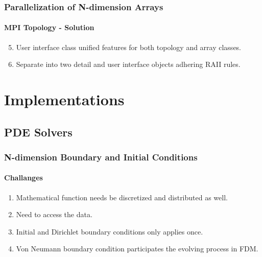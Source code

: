 \begin{frame}
  \frametitle{Parallelization of N-dimension Arrays}
  \framesubtitle{MPI Topology - Solution}
  \begin{enumerate}
    \setcounter{enumi}{4}
    \item User interface class unified features for both topology and array classes.
    \item Separate into two detail and user interface objects adhering RAII rules.
  \end{enumerate}
\end{frame}


































































\section{Implementations}
\subsection{PDE Solvers}
\begin{frame}
  \frametitle{N-dimension Boundary and Initial Conditions}
  \framesubtitle{Challanges}
  \begin{enumerate}
    \item Mathematical function needs be discretized and distributed as well.
    \item Need to access the data.
    \item Initial and Dirichlet boundary conditions only applies once.
    \item Von Neumann boundary condition participates the evolving process in FDM.
  \end{enumerate}
\end{frame}


